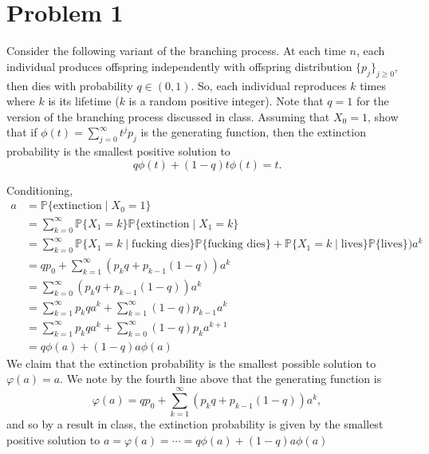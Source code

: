 \documentclass[11pt]{article}
\newcommand{\bbP}{\mathbb{P}}
\begin{document}
	
	
	\psetheader
\section*{Problem 1}
\begin{problem}
    Consider the following variant of the branching process. At each time \( n \), each individual produces offspring independently with offspring distribution \(\{p_j\}_{j \geq 0}\), then dies with probability \( q \in (0,1) \). So, each individual reproduces \( k \) times where \( k \) is its lifetime (\( k \) is a random positive integer). Note that \( q = 1 \) for the version of the branching process discussed in class. Assuming that \( X_0 = 1 \), show that if \( \phi(t) = \sum_{j=0}^\infty t^j p_j \) is the generating function, then the extinction probability is the smallest positive solution to
\[
q\phi(t) + (1-q)t\phi(t) = t.
\]

\end{problem}
\begin{solution}
Conditioning, 
\begin{align*}
  a &= \bbP\{\text{extinction} \mid X_0 = 1\}\\ &= \sum_{k=0}^\infty \bbP\{X_1 = k\}\bbP\{\text{extinction} \mid X_1 = k \}  \\
  &= \sum_{k=0}^\infty \bbP\{X_1 = k \mid \text{fucking dies}\}\bbP\{\text{fucking dies}\} + \bbP\{X_1 = k \mid \text{lives}\}\bbP\{\text{lives}\})a^k\\
  &= qp_0 + \sum_{k=1}^\infty (p_kq + p_{k-1}(1-q))a^k\\
  &= \sum_{k=0}^\infty (p_kq + p_{k-1}(1-q))a^k\\
  &= \sum_{k=1}^\infty p_k qa^k + \sum_{k=1}^\infty (1-q)p_{k-1}a^k\\
  &= \sum_{k=1}^\infty p_k qa^k + \sum_{k=0}^\infty (1-q)p_{k}a^{k+1}\\
  &= q\phi(a) + (1-q) a \phi(a)
\end{align*} We claim that the extinction probability is the smallest possible solution to $\varphi(a) = a.$ We note  by the fourth line above that the generating function is
\[\varphi(a) = qp_0 + \sum_{k=1}^\infty (p_kq + p_{k-1}(1-q))a^k,\] and so by a result in class, the extinction probability is given by the smallest positive solution to 
$a=  \varphi(a) = \cdots = q\phi(a) + (1-q)a\phi(a)$
\end{solution} 
\end{document}
